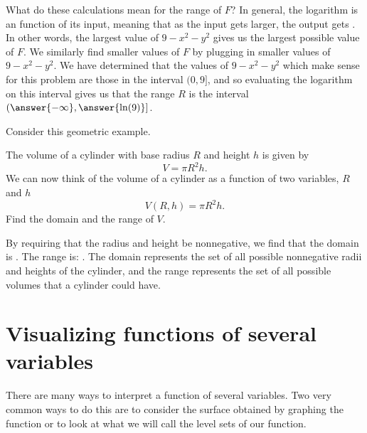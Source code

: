 \documentclass{ximera}
\begin{document}
\begin{question}
\begin{question}
\begin{question}
\begin{prompt}
        What do these calculations mean for the range of $F$?  In
        general, the logarithm is an
        function of its input, meaning that as the input gets larger,
        the output gets
        .  In
        other words, the largest value of $9-x^2-y^2$ gives us the
        largest possible value of $F$.  We similarly find smaller
        values of $F$ by plugging in smaller values of $9-x^2-y^2$.
        We have determined that the values of $9-x^2-y^2$ which make
        sense for this problem are those in the interval $(0, 9]$, and
  so evaluating the logarithm on this interval gives us that the range
  $R$ is the interval $\left(\answer{-\infty},\answer{\ln(9)}\right]$.
      \end{prompt}
    \end{question}
  \end{question}
\end{question}

Consider this geometric example.
\begin{example}
  The volume of a cylinder with base radius $R$ and height $h$ is
  given by
  \[
  V=\pi R^2h.
  \]
  We can now think of the volume of a cylinder as a function of two
  variables, $R$ and $h$
  \[
  V(R,h) = \pi R^2h.
  \]
  Find the domain and the range of $V$.
  \begin{explanation}
    By requiring that the radius and height be nonnegative, we find that the domain is
    \wordChoice{
      \choice{$\R$}
      \choice{$[0,\infty)$}
      \choice[correct]{Points $(R,h)$ in $\R^2$ where $R \geq 0$ and $h \geq 0$, or in set notation $\{ (R,h) \in \R^2 : R \geq 0, h \geq 0\}$}
      }. 
The range is:
\wordChoice{
  \choice{$\R$}
  \choice[correct]{$[0,\infty)$}
  \choice{$\{ (R,h) \in \R^2 : R \geq 0, h \geq 0\}$}
  }.
The domain represents the set of all possible nonnegative radii and heights of the cylinder, and the range represents the set of all possible volumes that a cylinder could have.
  \end{explanation}
\end{example}



\section{Visualizing functions of several variables}

There are many ways to interpret a function of several variables.  Two
very common ways to do this are to consider the surface obtained by graphing 
the function or to look at what we will call the level sets of our function.
\end{document}
